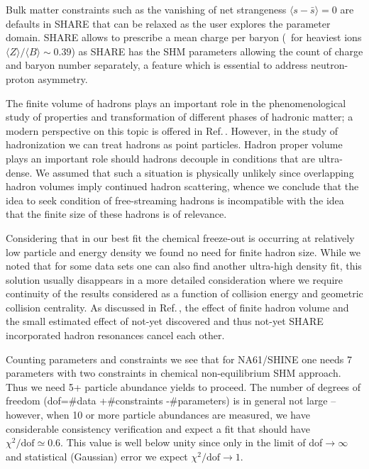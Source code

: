\documentclass{appolb}
\begin{document}
Bulk matter constraints such as the vanishing of net strangeness $\langle s - \bar{s}\rangle=0$ are defaults in SHARE that can be relaxed as the user explores the parameter domain. SHARE allows to prescribe a mean charge per baryon (\ie\ for heaviest ions $\langle Z\rangle/\langle B\rangle\sim 0.39$) as SHARE has the SHM parameters allowing the count of charge and baryon number separately, a feature which is essential to address neutron-proton asymmetry.

The finite volume of hadrons plays an important role in the phenomenological study of properties and transformation of different phases of hadronic matter; a modern perspective on this topic is offered in Ref.\,\cite{Rafelski:2015cxa}. However, in the study of hadronization we can treat hadrons as point particles. Hadron proper volume plays an important role should hadrons decouple in conditions that are ultra-dense. We assumed that such a situation is physically unlikely since overlapping hadron volumes imply continued hadron scattering, whence we conclude that the idea to seek condition of free-streaming hadrons is incompatible with the idea that the finite size of these hadrons is of relevance. 

Considering that in our best fit the chemical freeze-out is occurring at relatively low particle and energy density we found  no need for finite hadron size. While we noted that for some data sets one can also find another ultra-high density fit, this solution usually disappears in a more detailed consideration where we require continuity of the results considered as a function of collision energy and geometric collision centrality. As discussed in Ref.\,\cite{Rafelski:2015cxa}, the effect of finite hadron volume and the small estimated effect of not-yet discovered and thus not-yet SHARE incorporated hadron resonances cancel each other.

Counting parameters and constraints we see that for NA61/SHINE one needs 7  parameters with two constraints  in chemical non-equilibrium SHM approach. Thus we need 5+ particle abundance yields to proceed. The number of degrees of freedom (dof=\#data +\#constraints -\#parameters) is in general not large -- however,  when 10 or more particle abundances are measured, we have considerable consistency verification and expect a fit that should have $\chi^2/\mathrm{dof}\simeq 0.6$. This value is well below unity since only in the limit of dof$\to\infty$ and statistical (Gaussian) error we expect $\chi^2/\mathrm{dof}\to 1$. 
\end{document}
